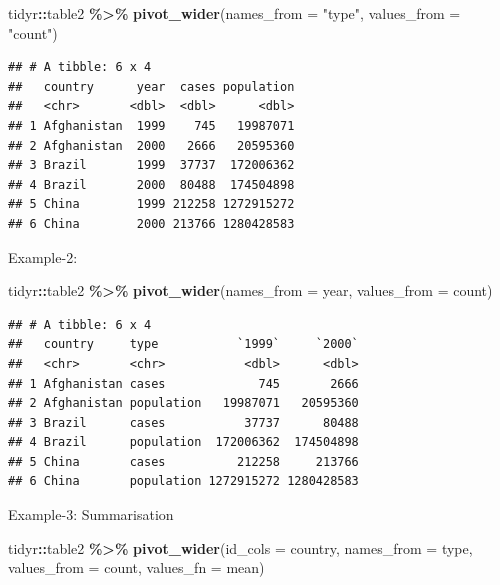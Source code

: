 \documentclass[
]{book}
\newenvironment{Shaded}{\begin{snugshade}}{\end{snugshade}}
\newcommand{\AttributeTok}[1]{\textcolor[rgb]{0.13,0.29,0.53}{#1}}
\newcommand{\FunctionTok}[1]{\textcolor[rgb]{0.13,0.29,0.53}{\textbf{#1}}}
\newcommand{\NormalTok}[1]{#1}
\newcommand{\SpecialCharTok}[1]{\textcolor[rgb]{0.81,0.36,0.00}{\textbf{#1}}}
\newcommand{\StringTok}[1]{\textcolor[rgb]{0.31,0.60,0.02}{#1}}
\begin{document}
\begin{Shaded}
\begin{Highlighting}[]
\NormalTok{tidyr}\SpecialCharTok{::}\NormalTok{table2 }\SpecialCharTok{\%\textgreater{}\%} 
  \FunctionTok{pivot\_wider}\NormalTok{(}\AttributeTok{names\_from =} \StringTok{"type"}\NormalTok{,}
              \AttributeTok{values\_from =} \StringTok{"count"}\NormalTok{)}
\end{Highlighting}
\end{Shaded}

\begin{verbatim}
## # A tibble: 6 x 4
##   country      year  cases population
##   <chr>       <dbl>  <dbl>      <dbl>
## 1 Afghanistan  1999    745   19987071
## 2 Afghanistan  2000   2666   20595360
## 3 Brazil       1999  37737  172006362
## 4 Brazil       2000  80488  174504898
## 5 China        1999 212258 1272915272
## 6 China        2000 213766 1280428583
\end{verbatim}

Example-2:

\begin{Shaded}
\begin{Highlighting}[]
\NormalTok{tidyr}\SpecialCharTok{::}\NormalTok{table2 }\SpecialCharTok{\%\textgreater{}\%} 
  \FunctionTok{pivot\_wider}\NormalTok{(}\AttributeTok{names\_from =}\NormalTok{ year,}
              \AttributeTok{values\_from =}\NormalTok{ count)}
\end{Highlighting}
\end{Shaded}

\begin{verbatim}
## # A tibble: 6 x 4
##   country     type           `1999`     `2000`
##   <chr>       <chr>           <dbl>      <dbl>
## 1 Afghanistan cases             745       2666
## 2 Afghanistan population   19987071   20595360
## 3 Brazil      cases           37737      80488
## 4 Brazil      population  172006362  174504898
## 5 China       cases          212258     213766
## 6 China       population 1272915272 1280428583
\end{verbatim}

Example-3: Summarisation

\begin{Shaded}
\begin{Highlighting}[]
\NormalTok{tidyr}\SpecialCharTok{::}\NormalTok{table2 }\SpecialCharTok{\%\textgreater{}\%} 
  \FunctionTok{pivot\_wider}\NormalTok{(}\AttributeTok{id\_cols =}\NormalTok{ country,}
              \AttributeTok{names\_from =}\NormalTok{ type,}
              \AttributeTok{values\_from =}\NormalTok{ count,}
              \AttributeTok{values\_fn =}\NormalTok{ mean)}
\end{Highlighting}
\end{Shaded}
\end{document}
